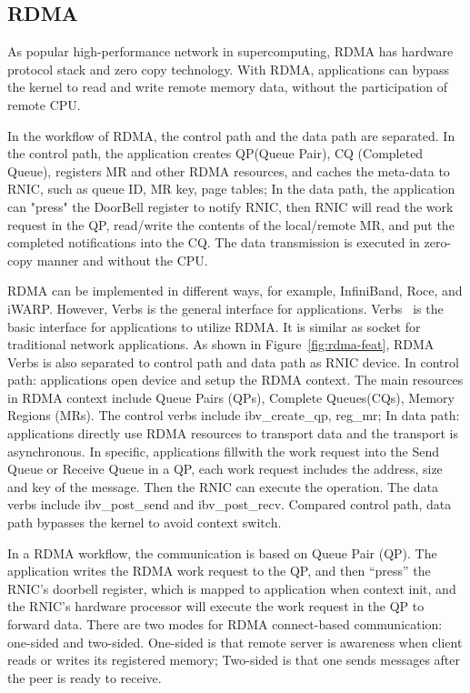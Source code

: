 \subsection{RDMA}
As popular high-performance network in supercomputing, RDMA has hardware protocol stack and zero copy technology. With RDMA, applications can bypass the kernel to read and write remote memory data, without the participation of remote CPU. 


In the workflow of RDMA, the control path and the data path are separated. In the control path, the application creates QP(Queue Pair), CQ (Completed Queue), registers MR and other RDMA resources, and caches the meta-data to RNIC, such as queue ID, MR key, page tables; In the data path, the application can "press"  the DoorBell register to notify RNIC, then RNIC will read the work request in the QP, read/write the contents of the local/remote MR, and put the completed notifications into the CQ. The data transmission is executed in zero-copy manner and without the CPU.

RDMA can be implemented in different ways, for example, InfiniBand, Roce, and iWARP. However, Verbs is the general interface for applications. Verbs~\cite{verbs} is the basic interface for applications to utilize RDMA. It is similar as socket for traditional network applications. As shown in Figure~\ref{fig:rdma-feat}, RDMA Verbs is also separated to control path and data path as RNIC device. In control path: applications open device and setup the RDMA context. The main resources in RDMA context include Queue Pairs (QPs), Complete Queues(CQs), Memory Regions (MRs). The control verbs include ibv\_create\_qp, reg\_mr;  In data path: applications directly use RDMA resources to transport data and the transport is asynchronous. In specific, applications fillwith the work request into the Send Queue or Receive Queue in a QP, each work request includes the address, size and key of the message. Then the RNIC can execute the operation. The data verbs include ibv\_post\_send and ibv\_post\_recv. Compared control path, data path bypasses the kernel to avoid context switch.

In a RDMA workflow, the communication is based on Queue Pair (QP). The application writes the RDMA work request to the QP, and then ``press''  the RNIC's doorbell register, which is mapped to application when context init, and the RNIC's hardware processor will execute the work request in the QP to forward data. There are two modes for RDMA connect-based communication: one-sided and two-sided. One-sided is that remote server is awareness when client reads or writes its registered memory; Two-sided is that one sends messages after the peer is ready to receive.